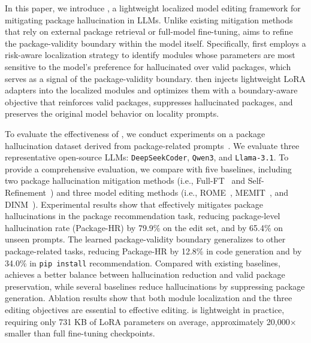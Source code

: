 In this paper, we introduce \textbf{\appname}, a lightweight localized model editing framework for mitigating package hallucination in LLMs. Unlike existing mitigation methods that rely on external package retrieval or full-model fine-tuning, \appname aims to refine the package-validity boundary within the model itself. 
Specifically, \appname first employs a risk-aware localization strategy to identify modules whose parameters are most sensitive to the model’s preference for hallucinated over valid packages, which serves as a signal of the package-validity boundary. \appname then injects lightweight LoRA adapters into the localized modules and optimizes them with a boundary-aware objective that reinforces valid packages, suppresses hallucinated packages, and preserves the original model behavior on locality prompts.


To evaluate the effectiveness of \appname, we conduct experiments on a package hallucination dataset derived from package-related prompts~\cite{spracklen2025we}. We evaluate three representative open-source LLMs: \texttt{DeepSeekCoder}, \texttt{Qwen3}, and \texttt{Llama-3.1}. To provide a comprehensive evaluation, we compare \appname with five baselines, including two package hallucination mitigation methods (i.e., Full-FT~\cite{spracklen2025we} and Self-Refinement~\cite{spracklen2025we}) and three model editing methods (i.e., ROME~\cite{meng2022rome}, MEMIT~\cite{meng2023memit}, and DINM~\cite{wang2024detoxifying}).
Experimental results show that  \appname effectively mitigates package hallucinations in the package recommendation task, reducing package-level hallucination rate (Package-HR) by 79.9\% on the edit set, and by 65.4\% on unseen prompts.  The learned package-validity boundary generalizes to other package-related tasks, reducing Package-HR by 12.8\% in code generation and by 34.0\% in \texttt{pip install} recommendation.  Compared with existing baselines, \appname achieves a better balance between hallucination reduction and valid package preservation, while several baselines reduce hallucinations by suppressing package generation. 
 Ablation results show that both module localization and the three editing objectives are essential to effective editing.  
 \appname is lightweight in practice, requiring only 731 KB of LoRA parameters on average, approximately 20,000$\times$ smaller than full fine-tuning checkpoints.

